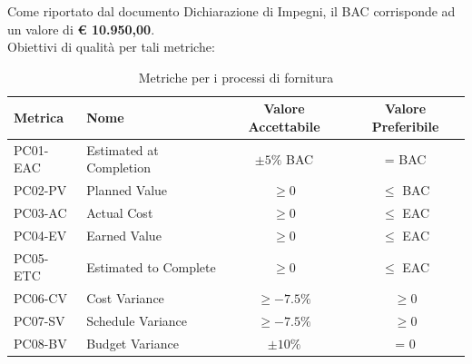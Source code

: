 \documentclass[a4paper,10pt]{article}
\begin{document}
Come riportato dal documento Dichiarazione di Impegni, il BAC corrisponde ad un valore di \textbf{€ 10.950,00}.
\\
Obiettivi di qualità per tali metriche: 
\begin{table}[H]
\centering
\renewcommand{\arraystretch}{1.2}
\begin{tabular}{|l|l|c|c|}
\hline
\textbf{Metrica} & \textbf{Nome} & \textbf{Valore Accettabile} & \textbf{Valore Preferibile} \\
\hline
PC01-EAC & Estimated at Completion & $\pm 5\%$ BAC & = BAC \\
PC02-PV  & Planned Value           & $\geq 0$      & $\leq$ BAC \\
PC03-AC  & Actual Cost             & $\geq 0$      & $\leq$ EAC \\
PC04-EV  & Earned Value             & $\geq 0$      & $\leq$ EAC \\
PC05-ETC & Estimated to Complete    & $\geq 0$      & $\leq$ EAC \\
PC06-CV  & Cost Variance            & $\geq -7.5\%$ & $\geq 0$ \\
PC07-SV  & Schedule Variance        & $\geq -7.5\%$ & $\geq 0$ \\
PC08-BV  & Budget Variance          & $\pm 10\%$    & = 0 \\
\hline
\end{tabular}
\caption{Metriche per i processi di fornitura}
\label{tab:metriche-fornitura}
\end{table}
\end{document}
